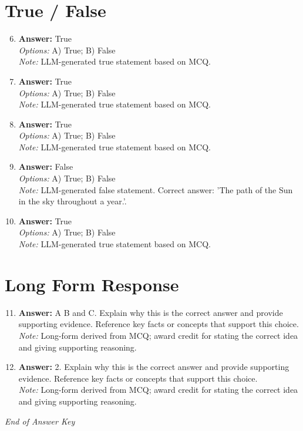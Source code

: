 \documentclass[12pt]{article}
\begin{document}
\section*{True / False}
\begin{enumerate}[label=\arabic*.]
\setcounter{enumi}{5}
\item \textbf{Answer:} True
\\ \textit{Options:} A) True; B) False
\\ \textit{Note:} LLM-generated true statement based on MCQ.
\item \textbf{Answer:} True
\\ \textit{Options:} A) True; B) False
\\ \textit{Note:} LLM-generated true statement based on MCQ.
\item \textbf{Answer:} True
\\ \textit{Options:} A) True; B) False
\\ \textit{Note:} LLM-generated true statement based on MCQ.
\item \textbf{Answer:} False
\\ \textit{Options:} A) True; B) False
\\ \textit{Note:} LLM-generated false statement. Correct answer: 'The path of the Sun in the sky throughout a year.'.
\item \textbf{Answer:} True
\\ \textit{Options:} A) True; B) False
\\ \textit{Note:} LLM-generated true statement based on MCQ.
\end{enumerate}

\section*{Long Form Response}
\begin{enumerate}[label=\arabic*.]
\setcounter{enumi}{10}
\item \textbf{Answer:} A B and C. Explain why this is the correct answer and provide supporting evidence. Reference key facts or concepts that support this choice.
\\ \textit{Note:} Long-form derived from MCQ; award credit for stating the correct idea and giving supporting reasoning.
\item \textbf{Answer:} 2. Explain why this is the correct answer and provide supporting evidence. Reference key facts or concepts that support this choice.
\\ \textit{Note:} Long-form derived from MCQ; award credit for stating the correct idea and giving supporting reasoning.
\end{enumerate}

\vfill
\noindent\textit{End of Answer Key}
\end{document}
